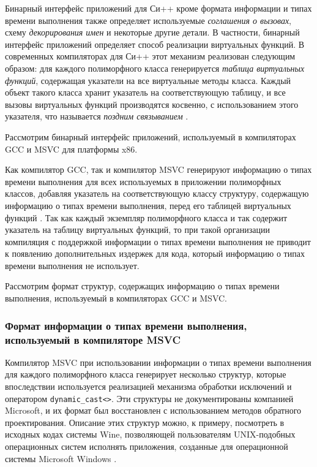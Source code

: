 Бинарный интерфейс приложений для Си++ кроме формата информации и типах времени выполнения также определяет используемые {\it соглашения о вызовах}, схему {\it декорирования имен} и некоторые другие детали. В частности, бинарный интерфейс приложений определяет способ реализации виртуальных функций. В современных компиляторах для Си++ этот механизм реализован следующим образом: для каждого полиморфного класса генерируется \textit{таблица виртуальных функций}, содержащая указатели на все виртуальные методы класса. Каждый объект такого класса хранит указатель на соответствующую таблицу, и все вызовы виртуальных функций производятся косвенно, с использованием этого указателя, что называется {\it поздним связыванием} \cite{gray94, gccabi}.

Рассмотрим бинарный интерфейс приложений, используемый в компиляторах GCC и MSVC для платформы x86.

Как компилятор GCC, так и компилятор MSVC генерируют информацию о типах времени выполнения для всех используемых в приложении полиморфных классов, добавляя указатель на соответствующую классу структуру, содержащую информацию о типах времени выполнения, перед его таблицей виртуальных функций \cite{skochinsky06, gccabi}. Так как каждый экземпляр полиморфного класса и так содержит указатель на таблицу виртуальных функций, то при такой организации компиляция с поддержкой информации о типах времени выполнения не приводит к появлению дополнительных издержек для кода, который информацию о типах времени выполнения не использует.

Рассмотрим формат структур, содержащих информацию о типах времени выполнения, используемый в компиляторах GCC и MSVC.






\subsubsection{Формат информации о типах времени выполнения, используемый в компиляторе MSVC}\label{chapter:rtti_in_msvc}
Компилятор MSVC при использовании информации о типах времени выполнения для каждого полиморфного класса генерирует несколько структур, которые впоследствии используется реализацией механизма обработки исключений и оператором \lstinline{dynamic_cast<>}. Эти структуры не документированы компанией Microsoft, и их формат был восстановлен с использованием методов обратного проектирования. Описание этих структур можно, к примеру, посмотреть в исходных кодах системы Wine, позволяющей пользователям UNIX-подобных операционных систем исполнять приложения, созданные для операционной системы Microsoft Windows \cite{wine}.

